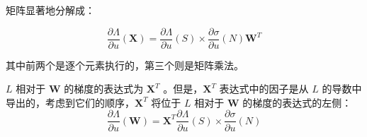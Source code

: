 矩阵显著地分解成：

\begin{equation*}
    \frac{\partial \Lambda}{\partial u}(\bm{X})=\frac{\partial \Lambda}{\partial u}(S)\times\frac{\partial \sigma}{\partial u}(N)\bm{W}^T
\end{equation*}

其中前两个是逐个元素执行的，第三个则是矩阵乘法。


$L$ 相对于 $\bm{W}$ 的梯度的表达式为 $\bm{X}^T$
。但是，$\bm{X}^T$ 表达式中的因子是从 $L$ 的导数中
导出的，考虑到它们的顺序，$\bm{X}^T$ 将位于 $L$ 相对于 $\bm{W}$ 的梯度的表达式的左侧：
\begin{equation*}
    \frac{\partial \Lambda}{\partial u}(\bm{W})=\bm{X}^T\frac{\partial \Lambda}{\partial u}(S)\times\frac{\partial \sigma}{\partial u}(N)
\end{equation*}